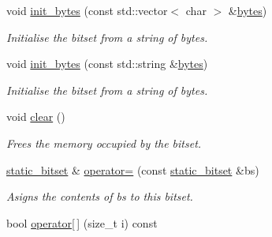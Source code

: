 \begin{DoxyCompactItemize}
void \hyperlink{classlgraph_1_1utils_1_1static__bitset_a00b39bf2552cbab68a9d5ee7f430e59d}{init\-\_\-bytes} (const std\-::vector$<$ char $>$ \&\hyperlink{classlgraph_1_1utils_1_1static__bitset_a56d277fc22bbf71a27fca530a133c9bd}{bytes})
\begin{DoxyCompactList}\small\item\em Initialise the bitset from a string of bytes. \end{DoxyCompactList}\item 
void \hyperlink{classlgraph_1_1utils_1_1static__bitset_a8fe9cefb9a05d30b1586810c6ccda923}{init\-\_\-bytes} (const std\-::string \&\hyperlink{classlgraph_1_1utils_1_1static__bitset_a56d277fc22bbf71a27fca530a133c9bd}{bytes})
\begin{DoxyCompactList}\small\item\em Initialise the bitset from a string of bytes. \end{DoxyCompactList}\item 
void \hyperlink{classlgraph_1_1utils_1_1static__bitset_a6013f8230ae37554328dfe0884d89c71}{clear} ()
\begin{DoxyCompactList}\small\item\em Frees the memory occupied by the bitset. \end{DoxyCompactList}\item 
\hyperlink{classlgraph_1_1utils_1_1static__bitset}{static\-\_\-bitset} \& \hyperlink{classlgraph_1_1utils_1_1static__bitset_a3215c8066fffcd8eed871914d42c40b8}{operator=} (const \hyperlink{classlgraph_1_1utils_1_1static__bitset}{static\-\_\-bitset} \&bs)
\begin{DoxyCompactList}\small\item\em Asigns the contents of {\itshape bs} to this bitset. \end{DoxyCompactList}\item 
\hypertarget{classlgraph_1_1utils_1_1static__bitset_addaadcc59dd1f73eaf5d95095c22b7be}{bool \hyperlink{classlgraph_1_1utils_1_1static__bitset_addaadcc59dd1f73eaf5d95095c22b7be}{operator\mbox{[}$\,$\mbox{]}} (size\-\_\-t i) const }\label{classlgraph_1_1utils_1_1static__bitset_addaadcc59dd1f73eaf5d95095c22b7be}


\end{DoxyCompactItemize}
